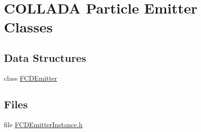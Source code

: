\hypertarget{group__FCDEmitters}{
\section{COLLADA Particle Emitter Classes}
\label{group__FCDEmitters}
}
\subsection*{Data Structures}
\begin{DoxyCompactItemize}
\item 
class \hyperlink{classFCDEmitter}{FCDEmitter}
\end{DoxyCompactItemize}
\subsection*{Files}
\begin{DoxyCompactItemize}
\item 
file \hyperlink{FCDEmitterInstance_8h}{FCDEmitterInstance.h}
\end{DoxyCompactItemize}
